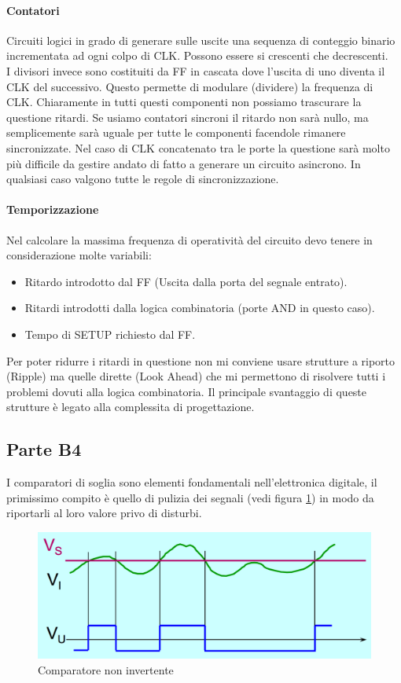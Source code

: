 \documentclass[12pt]{article}
\begin{document}
\paragraph{Contatori}
Circuiti logici in grado di generare sulle uscite una sequenza di conteggio binario incrementata ad ogni colpo di CLK. Possono essere si crescenti che decrescenti.\\
I divisori invece sono costituiti da FF in cascata dove l'uscita di uno diventa il CLK del successivo. Questo permette di modulare (dividere) la frequenza di CLK. Chiaramente in tutti questi componenti non possiamo trascurare la questione ritardi. Se usiamo contatori sincroni il ritardo non sarà nullo, ma semplicemente sarà uguale per tutte le componenti facendole rimanere sincronizzate. Nel caso di CLK concatenato tra le porte la questione sarà molto più difficile da gestire andato di fatto a generare un circuito asincrono. In qualsiasi caso valgono tutte le regole di sincronizzazione.

\paragraph{Temporizzazione}
Nel calcolare la massima frequenza di operatività del circuito devo tenere in considerazione molte variabili:
\begin{itemize}
  \item Ritardo introdotto dal FF (Uscita dalla porta del segnale entrato).
  \item Ritardi introdotti dalla logica combinatoria (porte AND in questo caso).
  \item Tempo di SETUP richiesto dal FF.
\end{itemize}
Per poter ridurre i ritardi in questione non mi conviene usare strutture a riporto (Ripple) ma quelle dirette (Look Ahead) che mi permettono di risolvere tutti i problemi dovuti alla logica combinatoria. Il principale svantaggio di queste strutture è legato alla complessita di progettazione.

\subsection{Parte B4}\label{b4}
I comparatori di soglia sono elementi fondamentali nell'elettronica digitale, il primissimo compito è quello di pulizia dei segnali (vedi figura \ref{fig:comparator}) in modo da riportarli al loro valore privo di disturbi.
\begin{figure}[!hp]
  \includegraphics[width=\textwidth]{images/comparator.png}
  \caption{Comparatore non invertente}
  \label{fig:comparator}
\end{figure}
\end{document}
